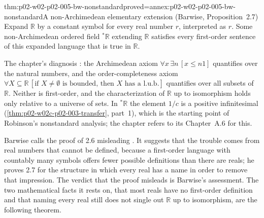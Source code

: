 \begin{hbtheorem}{thm:p02-w02-p02-005-bw-nonstandard}{proved=annex:p02-w02-p02-005-bw-nonstandard}{A non-Archimedean elementary extension (Barwise, Proposition~2.7)}
Expand \(\mathbb R\) by a constant symbol for every real number \(r\),
interpreted as \(r\).  Some non-Archimedean ordered field \({}^*\mathbb R\)
extending \(\mathbb R\) satisfies every first-order sentence of this
expanded language that is true in \(\mathbb R\).
\end{hbtheorem}

The chapter's diagnosis \cite[ch.~A.1, \S2, pp.~12--13]{Barwise1977FirstOrder}:
the Archimedean axiom \(\forall x\,\exists n\,[x\leq n1]\) quantifies over
the natural numbers, and the order-completeness axiom
\(\forall X\subseteq\mathbb R\,[\text{if }X\neq\emptyset\text{ is bounded,
then }X\text{ has a l.u.b.}]\) quantifies over all subsets of \(\mathbb R\).
Neither is first-order, and the characterization of \(\mathbb R\) up to
isomorphism holds only relative to a universe of sets.  In
\({}^*\mathbb R\) the element \(1/c\) is a positive infinitesimal
(\cref{thm:p02-w02c-p02-003-transfer}, part~1), which is the starting
point of Robinson's nonstandard analysis; the chapter refers to its
Chapter~A.6 for this.

Barwise calls the proof of 2.6 misleading
\cite[ch.~A.1, \S2, p.~12]{Barwise1977FirstOrder}.  It suggests that the
trouble comes from real numbers that cannot be defined, because a
first-order language with countably many symbols offers fewer possible
definitions than there are reals; he proves 2.7 for the structure in which
every real has a name in order to remove that impression.  The verdict
that the proof misleads is Barwise's assessment.  The two mathematical
facts it rests on, that most reals have no first-order definition and that
naming every real still does not single out \(\mathbb R\) up to
isomorphism, are the following theorem.


